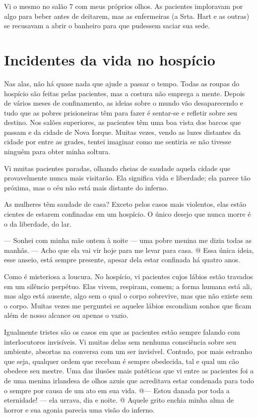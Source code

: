 Vi o mesmo no salão 7 com meus próprios olhos. As pacientes imploravam
por algo para beber antes de deitarem, mas as enfermeiras (a Srta. Hart
e as outras) se recusavam a abrir o banheiro para que pudessem saciar
sua sede.

\label{section-9}

\chapter{Incidentes da vida no
hospício}\label{capuxedtulo-xv-incidentes-da-vida-no-hospuxedcio}

Nas alas, não há quase nada que ajude a passar o tempo. Todas as roupas
do hospício são feitas pelas pacientes, mas a costura não emprega a
mente. Depois de vários meses de confinamento, as ideias sobre o mundo
vão desaparecendo e tudo que as pobres prisioneiras têm para fazer é
sentar-se e refletir sobre seu destino. Nos salões superiores, as
pacientes têm uma boa vista dos barcos que passam e da cidade de Nova
Iorque. Muitas vezes, vendo as luzes distantes da cidade por entre as
grades, tentei imaginar como me sentiria se não tivesse ninguém para
obter minha soltura.

Vi muitas pacientes paradas, olhando cheias de saudade aquela cidade que
provavelmente nunca mais visitarão. Ela significa vida e liberdade; ela
parece tão próxima, mas o céu não está mais distante do inferno.

As mulheres têm saudade de casa? Exceto pelos casos mais violentos, elas
estão cientes de estarem confinadas em um hospício. O único desejo que
nunca morre é o da liberdade, do lar.

--- Sonhei com minha mãe ontem à noite --- uma pobre menina me dizia
todas as manhãs. --- Acho que ela vai vir hoje para me levar para casa.
@ Essa única ideia, esse anseio, está sempre presente, apesar dela estar
confinada há quatro anos.

Como é misteriosa a loucura. No hospício, vi pacientes cujos lábios
estão travados em um silêncio perpétuo. Elas vivem, respiram, comem; a
forma humana está ali, mas algo está ausente, algo sem o qual o corpo
sobrevive, mas que não existe sem o corpo. Muitas vezes me perguntei se
aqueles lábios escondiam sonhos que ficam além de nosso alcance ou
apenas o vazio.

Igualmente tristes são os casos em que as pacientes estão sempre falando
com interlocutores invisíveis. Vi muitas delas sem nenhuma consciência
sobre seu ambiente, absortas na conversa com um ser invisível. Contudo,
por mais estranho que seja, qualquer ordem que recebam é sempre
obedecida, tal e qual um cão obedece seu mestre. Uma das ilusões mais
patéticas que vi entre as pacientes foi a de uma menina irlandesa de
olhos azuis que acreditava estar condenada para todo o sempre por causa
de um ato em sua vida. @--- Estou danada por toda a eternidade! --- ela
urrava, dia e noite. @ Aquele grito enchia minha alma de horror e sua
agonia parecia uma visão do inferno.

